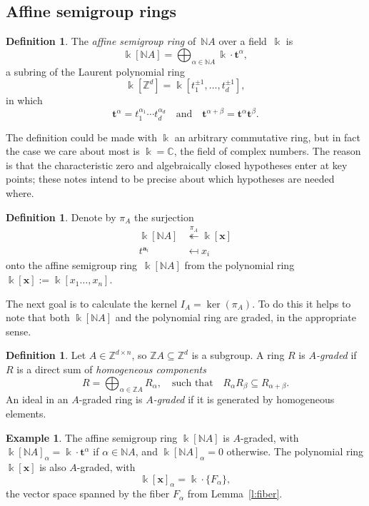 \documentclass[12pt]{amsart}
\numberwithin{equation}{section}
\theoremstyle{definition}
\newtheorem{defn}[thm]{Definition}
\newtheorem{example}[thm]{Example}
\begin{document}
\subsection{Affine semigroup rings}
\begin{defn}
The \emph{affine semigroup ring} of~${\mathbb{N}} A$ over a field~${\Bbbk}$ is
$$  {\Bbbk}[{\mathbb{N}} A] = \bigoplus_{\alpha\in{\mathbb{N}} A} {\Bbbk} \cdot {{\mathbf{t}}}^\alpha,
$$
a subring of the Laurent polynomial ring
$$  {\Bbbk}[{\mathbb{Z}}^d] = {\Bbbk}[t_1^{\pm1},\ldots,t_d^{\pm1}],
$$
in which
$$  {{\mathbf{t}}}^\alpha = t_1^{\alpha_1}\cdots t_d^{\alpha_d}
  \quad\text{and}\quad {{\mathbf{t}}}^{\alpha+\beta} = {{\mathbf{t}}}^\alpha{{\mathbf{t}}}^\beta.
$$
\end{defn}
The definition could be made with ${\Bbbk}$ an arbitrary commutative ring,
but in fact the case we care about most is ${\Bbbk} = {\mathbb{C}}$, the field of
complex numbers.  The reason is that the characteristic zero and
algebraically closed hypotheses enter at key points; these notes
intend to be precise about which hypotheses are needed where.

\begin{defn}\label{d:surj}
Denote by $\pi_A$ the surjection
\begin{align*}
  {\Bbbk}[{\mathbb{N}} A] &\stackrel{\pi_A}{\twoheadleftarrow} {\Bbbk}[{\mathbf{x}}]
\\ t^{{\mathbf{a}}_i} &\mapsfrom x_i
\end{align*}
onto the affine semigroup ring~${\Bbbk}[{\mathbb{N}} A]$ from the polynomial
ring~${\Bbbk}[{\mathbf{x}}] := {\Bbbk}[x_1\ldots,x_n]$.
\end{defn}

The next goal is to calculate the kernel $I_A = \ker(\pi_A)$.  To do
this it helps to note that both ${\Bbbk}[{\mathbb{N}} A]$ and the polynomial ring
are graded, in the appropriate sense.

\begin{defn}\label{d:A-graded}
Let $A \in {\mathbb{Z}}^{d \times n}$, so ${\mathbb{Z}} A \subseteq {\mathbb{Z}}^d$ is a
subgroup.  A ring $R$ is \emph{$A$-graded} if $R$ is a direct sum of
\emph{homogeneous components}
$$  R = \bigoplus_{\alpha\in{\mathbb{Z}} A} R_\alpha, \quad\text{such that}\quad
  R_\alpha R_\beta \subseteq R_{\alpha+\beta}.
$$
An ideal in an $A$-graded ring is \emph{$A$-graded} if it is generated
by homogeneous elements.
\end{defn}

\begin{example}\label{e:A-graded}
The affine semigroup ring ${\Bbbk}[{\mathbb{N}} A]$ is $A$-graded, with ${\Bbbk}[{\mathbb{N}}
A]_\alpha = {\Bbbk}\cdot{{\mathbf{t}}}^\alpha$ if $\alpha \in {\mathbb{N}} A$, and ${\Bbbk}[{\mathbb{N}}
A]_\alpha = 0$ otherwise.  The polynomial ring ${\Bbbk}[{\mathbf{x}}]$ is also
$A$-graded, with
$$  {\Bbbk}[{\mathbf{x}}]_\alpha = {\Bbbk}\cdot\{F_\alpha\},
$$
the vector space spanned by the fiber $F_\alpha$ from
Lemma~\ref{l:fiber}.
\end{example}
\end{document}
